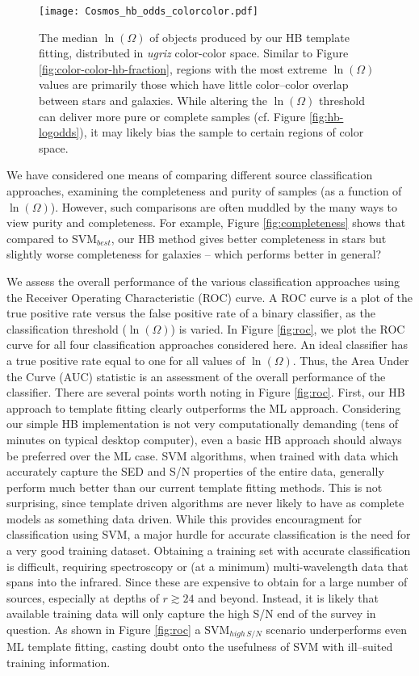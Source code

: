 \documentclass[12pt,preprint]{aastex}
\begin{document}
\begin{figure}
\centering
\texttt{[image: Cosmos\_hb\_odds\_colorcolor.pdf]}
\caption{The median $\ln(\Omega)$ of objects produced by our HB template fitting, distributed in {\it ugriz} 
color-color space.  Similar to Figure \ref{fig:color-color-hb-fraction}, regions with the most extreme 
$\ln(\Omega)$ values are primarily those which have little color--color overlap between stars and 
galaxies.  While altering the $\ln(\Omega)$ threshold can deliver more pure or complete samples
(cf. Figure \ref{fig:hb-logodds}), it may likely bias the sample to certain regions of color space.}
\label{fig:color-color-hb-odds}
\end{figure}


We have considered one means of comparing different source classification approaches,  
examining the completeness and purity of samples (as a function of $\ln(\Omega)$).  However, 
such comparisons are often muddled by the many ways to view purity and completeness.  For 
example, Figure \ref{fig:completeness} shows that compared to SVM$_{best}$, our HB method gives 
better completeness in stars but slightly worse completeness for galaxies -- which performs 
better in general?  

We assess the overall performance of the various classification approaches 
using the Receiver Operating Characteristic (ROC) curve.  A ROC curve is a plot of the true 
positive rate versus the false positive rate of a binary classifier, as the classification threshold 
($\ln(\Omega)$) is varied.  In Figure \ref{fig:roc}, we plot the ROC curve for all four classification 
approaches considered here.  An ideal classifier has a true positive rate equal to one for all 
values of $\ln(\Omega)$.  Thus, the Area Under the Curve (AUC) statistic is an assessment of the 
overall performance of the classifier.  There are several points worth noting in Figure 
\ref{fig:roc}.  First, our HB approach to template fitting clearly outperforms the ML approach.  
Considering our simple HB implementation is not very computationally demanding (tens of 
minutes on typical desktop computer), even a basic HB approach should always be preferred 
over the ML case.  SVM algorithms, when trained with data which accurately capture the SED and 
S/N properties of the entire data, generally perform much better than our current template fitting 
methods.  This is not surprising, since template driven algorithms are never likely to have as 
complete models as something data driven.  While this provides encouragment for classification using 
SVM, a major hurdle for accurate classification is the need for a very good training dataset.  
Obtaining a training set with accurate classification is difficult, requiring spectroscopy or (at 
a minimum) multi-wavelength data that spans into the infrared.  Since these are expensive to 
obtain for a large number of sources, especially at depths of $r\gtrsim24$ and beyond.  Instead, it is 
likely that available training data will only capture the high S/N end of the survey in question.  As 
shown in Figure \ref{fig:roc} a SVM$_{high\,S/N}$ scenario underperforms even ML template fitting, 
casting doubt onto the usefulness of SVM with ill--suited training information.  
\end{document}
